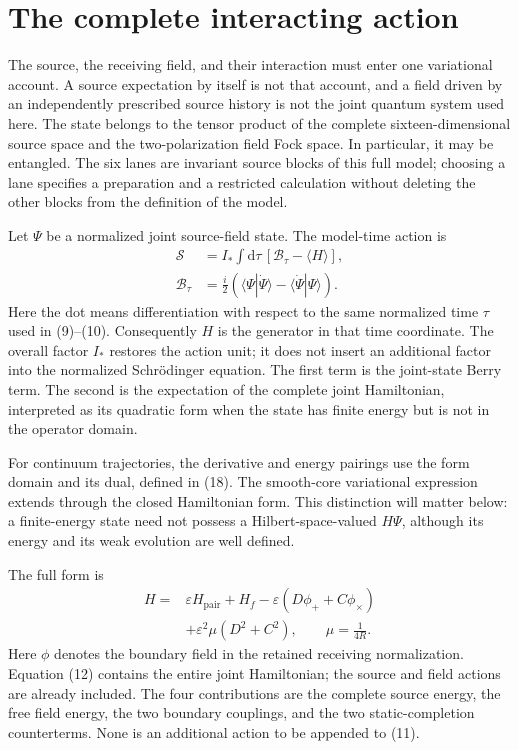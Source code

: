 \documentclass[10pt,twocolumn,letterpaper]{article}
\begin{document}
\section{The complete interacting action}
The source, the receiving field, and their interaction must enter one
variational account.  A source expectation by itself is not that account,
and a field driven by an independently prescribed source history is not
the joint quantum system used here.  The state belongs to the tensor
product of the complete sixteen-dimensional source space and the
two-polarization field Fock space.  In particular, it may be entangled.
The six lanes are invariant source blocks of this full model; choosing a
lane specifies a preparation and a restricted calculation without
deleting the other blocks from the definition of the model.

Let $\Psi$ be a normalized joint source-field state. The model-time action is
\begin{equation}
\begin{aligned}
\mathcal{S}&=I_*\int\mathrm{d}\tau\,[\mathcal{B}_\tau-\langle H\rangle],\\
\mathcal{B}_\tau&=\frac{i}{2}(\langle\Psi|\dot\Psi\rangle-\langle\dot\Psi|\Psi\rangle).
\end{aligned}
\tag{11}
\end{equation}
Here the dot means differentiation with respect to the same normalized
time $\tau$ used in (9)--(10).  Consequently $H$ is the generator in that
time coordinate.  The overall factor $I_*$ restores the action unit; it
does not insert an additional factor into the normalized Schr\"odinger
equation.  The first term is the joint-state Berry term.  The second is
the expectation of the complete joint Hamiltonian, interpreted as its
quadratic form when the state has finite energy but is not in the
operator domain.

For continuum trajectories, the derivative and energy pairings use the
form domain and its dual, defined in (18). The smooth-core variational
expression extends through the closed Hamiltonian form.  This distinction
will matter below: a finite-energy state need not possess a
Hilbert-space-valued $H\Psi$, although its energy and its weak evolution
are well defined.

The full form is
\begin{equation}
\begin{aligned}
H={}&\varepsilon H_{\mathrm{pair}}+H_f-\varepsilon(D\phi_++C\phi_\times)\\
&+\varepsilon^2\mu(D^2+C^2),\qquad \mu=\frac{1}{4R}.
\end{aligned}
\tag{12}
\end{equation}
Here $\phi$ denotes the boundary field in the retained receiving
normalization. Equation (12) contains the entire joint Hamiltonian; the
source and field actions are already included.  The four contributions
are the complete source energy, the free field energy, the two boundary
couplings, and the two static-completion counterterms.  None is an
additional action to be appended to (11).
\end{document}
